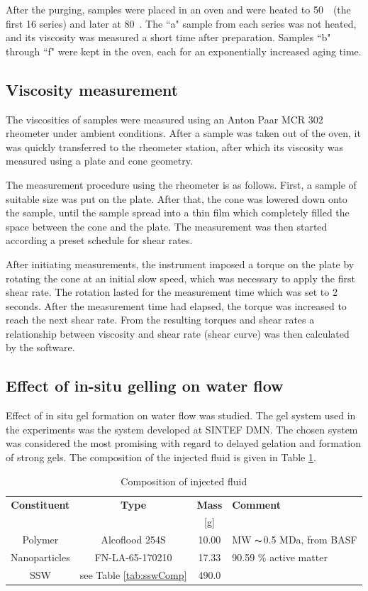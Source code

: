 \documentclass[journal = enfuem, manuscript =  article]{achemso}
\begin{document}
After the purging, samples were placed in an oven and were heated to 50~\celsius~(the first 16 series) and later at 80~\celsius. The ``a" sample from each series was not heated, and its viscosity was measured a short time after preparation. Samples ``b" through ``f" were kept in the oven, each for an exponentially increased aging time. 

\subsection{Viscosity measurement}
The viscosities of samples were measured using an Anton Paar MCR 302 rheometer under ambient conditions. After a sample was taken out of the oven, it was quickly transferred to the rheometer station, after which its viscosity was measured using a plate and cone geometry.

The measurement procedure using the rheometer is as follows. First, a sample of suitable size was put on the plate. After that, the cone was lowered down onto the sample, until the sample spread into a thin film which completely filled the space between the cone and the plate. The measurement was then started according a preset schedule for shear rates. 

After initiating measurements, the instrument imposed a torque on the plate by rotating the cone at an initial slow speed, which was necessary to apply the first shear rate. The rotation lasted for the measurement time which was set to 2 seconds. After the measurement time had elapsed, the torque was increased to reach the next shear rate. From the resulting torques and shear rates a relationship between viscosity and shear rate (shear curve) was then calculated by the software.

\subsection{Effect of in-situ gelling on water flow}
Effect of in situ gel formation on water flow was studied. The gel system used in the experiments was the system developed at SINTEF DMN. The chosen system was considered the most promising with regard to delayed gelation and formation of strong gels.  The composition of the injected fluid is given in Table \ref{tab:injComp}. 
\begin{table} 
\centering
\caption{Composition of injected fluid}
\label{tab:injComp}
\begin{tabular}{c c c l } 
\toprule
\textbf{Constituent} & \textbf{Type} & \textbf{Mass} & \textbf{Comment}\\ 
&& [g] & \\
\midrule 
Polymer & Alcoflood 254S & 10.00 & MW $\thicksim$0.5 MDa, from BASF\\
Nanoparticles & FN-LA-65-170210 & 17.33 & 90.59 \% active matter \\ 
SSW & see Table \ref{tab:sswComp} & 490.0 &  \\ 
\bottomrule
\end{tabular}
\end{table}
\end{document}
